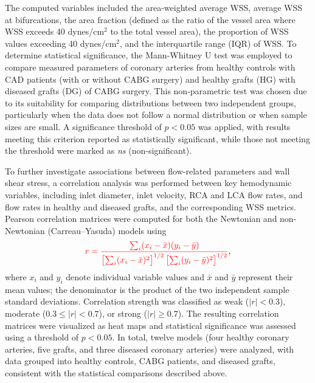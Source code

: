 ﻿\documentclass[12pt,a4paper]{article}
\newcommand{\added}[2][]{\begingroup\color{red}#2\endgroup}
\newcommand{\addp}[1]{\added{#1}}
\theoremstyle{definition}
\numberwithin{equation}{section}
\begin{document}
The computed variables included the area-weighted average WSS, average WSS at bifurcations, the area fraction (defined as the ratio of the vessel area where WSS exceeds 40 dynes/cm$^2$ to the total vessel area), the proportion of WSS values exceeding 40 dynes/cm$^2$, and the interquartile range (IQR) of WSS. To determine statistical significance, the Mann-Whitney U test was employed to compare measured parameters of coronary arteries from healthy controls with CAD patients (with or without CABG surgery)  and healthy grafts (HG) with diseased grafts (DG) of CABG surgery. This non-parametric test was chosen due to its suitability for comparing distributions between two independent groups, particularly when the data does not follow a normal distribution or when sample sizes are small. A significance threshold of $p < 0.05$ was applied, with results meeting this criterion reported as statistically significant, while those not meeting the threshold were marked as \textit{ns} (non-significant).


To further investigate associations between flow-related parameters and wall shear stress, a correlation analysis was performed between key hemodynamic variables, including inlet diameter, inlet velocity, RCA and LCA flow rates, and flow rates in healthy and diseased grafts, and the corresponding WSS metrics. Pearson correlation matrices were computed for both the Newtonian and non-Newtonian (Carreau--Yasuda) models using
\begin{equation}\label{eq:pearson}
\addp{r = \frac{\sum_i (x_i - \bar{x})(y_i - \bar{y})}{\bigl[\sum_i (x_i - \bar{x})^2\bigr]^{1/2}\,\bigl[\sum_i (y_i - \bar{y})^2\bigr]^{1/2}}},
\end{equation}
where \(x_i\) and \(y_i\) denote individual variable values and \(\bar{x}\) and \(\bar{y}\) represent their mean values\addp{; the denominator is the product of the two independent sample standard deviations}. Correlation strength was classified as weak (\(|r| < 0.3\)), moderate (\(0.3 \le |r| < 0.7\)), or strong (\(|r| \ge 0.7\)). The resulting correlation matrices were visualized as heat maps and statistical significance was assessed using a threshold of \(p < 0.05\). In total, twelve models (four healthy coronary arteries, five grafts, and three diseased coronary arteries) were analyzed, with data grouped into healthy controls, CABG patients, and diseased grafts, consistent with the statistical comparisons described above.
\end{document}
